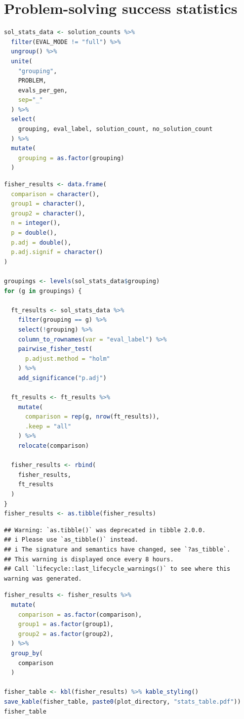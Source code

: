 \documentclass[
]{book}
\begin{document}
\hypertarget{problem-solving-success-statistics}{%
\section{Problem-solving success statistics}\label{problem-solving-success-statistics}}

\begin{lstlisting}[language=R]
sol_stats_data <- solution_counts %>%
  filter(EVAL_MODE != "full") %>%
  ungroup() %>%
  unite(
    "grouping",
    PROBLEM,
    evals_per_gen,
    sep="_"
  ) %>%
  select(
    grouping, eval_label, solution_count, no_solution_count
  ) %>%
  mutate(
    grouping = as.factor(grouping)
  )
\end{lstlisting}

\begin{lstlisting}[language=R]
fisher_results <- data.frame(
  comparison = character(),
  group1 = character(),
  group2 = character(),
  n = integer(),
  p = double(),
  p.adj = double(),
  p.adj.signif = character()
)

groupings <- levels(sol_stats_data$grouping)
for (g in groupings) {

  ft_results <- sol_stats_data %>%
    filter(grouping == g) %>%
    select(!grouping) %>%
    column_to_rownames(var = "eval_label") %>%
    pairwise_fisher_test(
      p.adjust.method = "holm"
    ) %>%
    add_significance("p.adj")

  ft_results <- ft_results %>%
    mutate(
      comparison = rep(g, nrow(ft_results)),
      .keep = "all"
    ) %>%
    relocate(comparison)

  fisher_results <- rbind(
    fisher_results,
    ft_results
  )
}
fisher_results <- as.tibble(fisher_results)
\end{lstlisting}

\begin{lstlisting}
## Warning: `as.tibble()` was deprecated in tibble 2.0.0.
## i Please use `as_tibble()` instead.
## i The signature and semantics have changed, see `?as_tibble`.
## This warning is displayed once every 8 hours.
## Call `lifecycle::last_lifecycle_warnings()` to see where this warning was generated.
\end{lstlisting}

\begin{lstlisting}[language=R]
fisher_results <- fisher_results %>%
  mutate(
    comparison = as.factor(comparison),
    group1 = as.factor(group1),
    group2 = as.factor(group2),
  ) %>%
  group_by(
    comparison
  )

fisher_table <- kbl(fisher_results) %>% kable_styling()
save_kable(fisher_table, paste0(plot_directory, "stats_table.pdf"))
fisher_table
\end{lstlisting}
\end{document}
